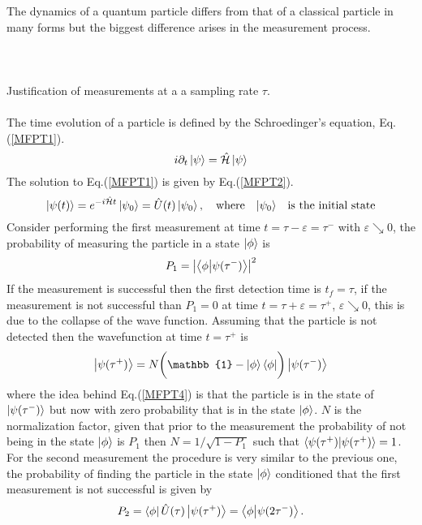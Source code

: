 \documentclass{article}
\numberwithin{equation}{section}
\renewcommand{\H}{\mathcal{\hat{H}}} %
\newcommand{\1}{\mathbb{1}}
\newcommand{\state}{\ket{\phi}}
\newcommand{\projection}{\bra{\phi}}
\begin{document}
The dynamics of a quantum particle differs from that of a classical particle in many forms but the biggest difference arises in the measurement process. 
\\
\\
\\
\\
Justification of measurements at a a sampling rate $\tau$. 
\\\\
The time evolution of a particle is defined by the Schroedinger's equation, Eq.(\ref{MFPT1}).
\begin{equation}\label{MFPT1}
    i\partial_t\ket{\psi}=\H\ket{\psi}
\end{equation}
The solution to Eq.(\ref{MFPT1}) is given by Eq.(\ref{MFPT2}).
\begin{equation}\label{MFPT2}
\ket{\psi(t)}=e^{-i\H t}\ket{\psi_0}=\hat{U}(t)\ket{\psi_0}, \quad \text{where} \quad {\ket{\psi_0}}\quad \text{is the initial state}
\end{equation}
Consider performing the first measurement at time $t=\tau-\varepsilon=\tau^-$ with $\varepsilon\searrow0$, the probability of measuring the particle in a state $\state$ is 
\begin{equation}\label{MFPT3}
    P_1=\abs{\projection\ket{\psi(\tau^-)}}^2
\end{equation}
If the measurement is successful then the first detection time is $t_f=\tau$, if the measurement is not successful than $P_1=0$ at time $t=\tau+\varepsilon=\tau^+$, $\varepsilon\searrow0$, this is due to the collapse of the wave function. Assuming that the particle is not detected then the wavefunction at time $t=\tau^+$ is
\begin{equation}\label{MFPT4} %
    \ket{\psi(\tau^+)}=N\biggl(\1-\state\bra{\phi} \biggr)\ket{\psi(\tau^-)}
\end{equation}
where the idea behind Eq.(\ref{MFPT4}) is that the particle is in the state of $\ket{\psi(\tau^-)}$ but now with zero probability that is in the state $\state$. $N$ is the normalization factor, given that prior to the measurement the probability of not being in the state $\state$ is $P_1$ then $N=1/\sqrt{1-P_1}$ such that $\braket{\psi(\tau^+)}{\psi(\tau^+)}=1$.
\\
For the second measurement the procedure is very similar to the previous one, the probability of finding the particle in the state $\state$ conditioned that the first measurement is not successful is given by
\begin{equation}\label{MFPT5}
    P_2=\projection \hat{U}(\tau)\ket{\psi(\tau^+)}=\projection\ket{\psi(2\tau^-)}.
\end{equation}
\end{document}
